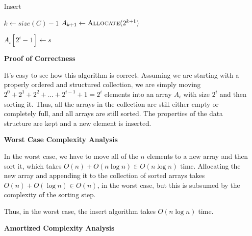 \documentclass{article}
\begin{document}
\begin{algorithm}
    \caption{Insert}\label{euclid}

    \begin{algorithmic}[1]
        \State $k \gets size(C) - 1$  
                \State $A_{k+1} \gets \Call{Allocate}{2^{k+1}}$
                \State {} 
            \EndIf
                \EndFor

                \State $A_{i}[2^i - 1] \gets s$
                \State {}
                \State \Return
            \EndIf
        \EndFor


        \EndProcedure
    \end{algorithmic}
\end{algorithm}

\newline

\textbf{Proof of Correctness}

It's easy to see how this algorithm is correct. Assuming we are starting with a properly ordered and structured
collection, we are simply moving $2^0 + 2^1 + 2^2 + \ldots + 2^{i-1} + 1 = 2^i$ elements into an array $A_i$ with size
$2^i$ and then sorting it. Thus, all the arrays in the collection are still either empty or completely full, and
all arrays are still sorted. The properties of the data structure are kept and a new element is inserted.
\newline

\textbf{Worst Case Complexity Analysis}

In the worst case, we have to move all of the $n$ elements to a new array and then sort it, which takes
$O(n) + O(n \log n) \in O(n \log n)$ time. Allocating the new array and appending it to the collection of sorted arrays
takes $O(n) + O(\log n) \in O(n)$, in the worst case, but this is subsumed by the complexity of the sorting step.

Thus, in the worst case, the insert algorithm takes $O(n \log n)$ time.
\newline

\textbf{Amortized Complexity Analysis}
\end{document}
